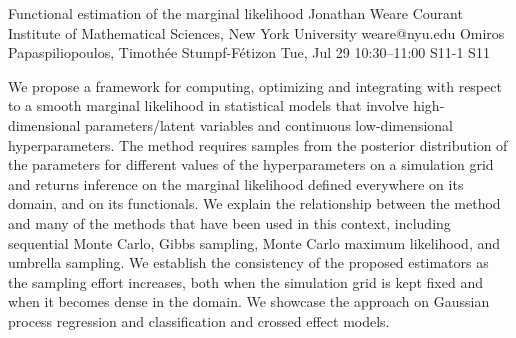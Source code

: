 \documentclass[12pt,lettersize,oneside]{book} %
\begin{document}
\begin{talk}
  {Functional estimation of the marginal likelihood}%
  {Jonathan Weare}%
  {Courant Institute of Mathematical Sciences, New York University}%
  {weare@nyu.edu}%
  {Omiros Papaspiliopoulos, Timoth\'ee Stumpf-F\'etizon}%
  {}%
  {Tue, Jul 29 10:30--11:00}%
  {S11-1}%
  {S11}%
  
    
   
We propose a framework for computing, optimizing and integrating with respect to
a smooth marginal likelihood in statistical models that involve high-dimensional parameters/latent
variables and continuous low-dimensional hyperparameters. The method requires samples from
the posterior distribution of the parameters for different values of the hyperparameters on a simulation grid and returns inference on the marginal likelihood defined everywhere on its domain,
and on its functionals. We explain the relationship between the method and many of the methods that have been
used in this context, including sequential Monte Carlo, Gibbs sampling, Monte Carlo maximum
likelihood, and umbrella sampling. We establish the consistency of the proposed estimators as
the sampling effort increases, both when the simulation grid is kept fixed and when it becomes
dense in the domain. We showcase the approach on Gaussian process regression and classification and crossed effect models.


\end{talk}
\end{document}
